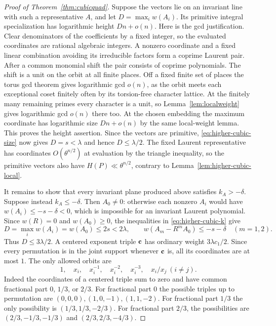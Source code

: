 \documentclass[11pt,a4paper,reqno]{amsart}
\theoremstyle{definition}
\theoremstyle{remark}
\numberwithin{equation}{section}
\begin{document}
\begin{proof}[Proof of Theorem~\ref{thm:cubicquad}]
Suppose the vectors lie on an invariant line
with such a representative \(A\), and let
\(D=\max_i w(A_i)\). Its primitive integral
specialization has logarithmic height
\(Dn+o(n)\). Here is the gcd justification.
Clear denominators of the coefficients by a fixed
integer, so the evaluated coordinates are rational
algebraic integers. A nonzero coordinate and a
fixed linear combination avoiding its irreducible
factors form a coprime Laurent pair. After a common
monomial shift the pair consists of coprime
polynomials. The shift is a unit on the orbit
at all finite places. Off a fixed finite set of
places the torus gcd theorem
\cite[Theorem~1.13(a)]{LW} gives
logarithmic gcd \(o(n)\), as the orbit meets each
exceptional coset finitely often by its torsion-free
character lattice. At the finitely many remaining
primes every character is a unit, so
Lemma~\ref{lem:localweight} gives logarithmic gcd
\(o(n)\) there too. At the chosen embedding the
maximum coordinate has logarithmic size \(Dn+o(n)\)
by the same local-weight lemma. This proves the
height assertion. Since the vectors are primitive,
\eqref{eq:higher-cubic-size} now gives \(D=s<\lambda\)
and hence \(D\le\lambda/2\). The fixed Laurent
representative has coordinates \(O(\theta^{n/2})\)
at evaluation by the triangle inequality, so
the primitive vectors also have
\(H(P)\ll\theta^{n/2}\), contrary to
Lemma~\ref{lem:higher-cubic-local}.

It remains to show that every invariant plane
produced above satisfies \(k_A>-\delta\).
Suppose instead \(k_A\le-\delta\). Then \(A_0\ne0\):
otherwise each nonzero \(A_i\) would have
\(w(A_i)\le-s-\delta<0\), which is impossible
for an invariant Laurent polynomial. Since
\(w(R)=0\) and \(w(A_0)\ge0\), the inequalities
in \eqref{eq:higher-cubic-k} give
\begin{equation}\label{eq:higher-cubic-support}
 D=\max_i w(A_i)=w(A_0)\le2s<2\lambda,\qquad
 w(A_m-R^m A_0)\le-s-\delta\quad(m=1,2).
\end{equation}
Thus \(D\le3\lambda/2\). A centered exponent triple
\({\bf c}\) has ordinary weight \(3\lambda c_1/2\).
Since every permutation is in the joint support
whenever \({\bf c}\) is, all its coordinates are
at most \(1\). The only allowed orbits are
\[
  1,\quad x_i,\quad x_i^{-1},\quad x_i^{-2},\quad
  x_i^{-3},\quad x_i/x_j\ (i\ne j).
\]
Indeed the coordinates of a centered triple sum
to zero and have common fractional part \(0\),
\(1/3\), or \(2/3\). For fractional part \(0\)
the possible triples up to permutation are
\((0,0,0),(1,0,-1),(1,1,-2)\).
For fractional part \(1/3\) the only possibility
is \((1/3,1/3,-2/3)\).
For fractional part \(2/3\), the possibilities
are \((2/3,-1/3,-1/3)\) and
\((2/3,2/3,-4/3)\).


\end{proof}
\end{document}
